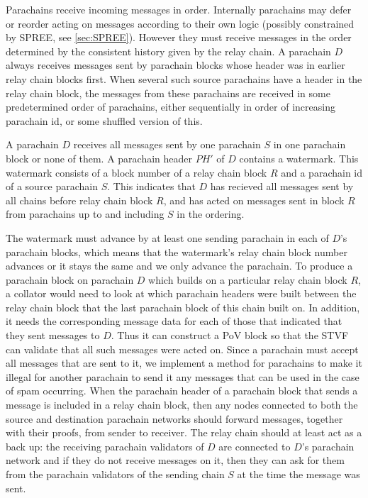 \documentclass{article}
\begin{document}
Parachains receive incoming messages in  order. Internally parachains may defer or reorder acting on messages according to their own logic (possibly constrained by SPREE, see \ref{sec:SPREE}). However they must receive messages in the order determined by the consistent history given by the relay chain.
A parachain $D$ always receives messages sent by parachain blocks whose header was in earlier relay chain blocks first. When several such source parachains have a header in the relay chain block, the messages from these parachains are received in some predetermined order of parachains, either sequentially in order of increasing parachain id, or some shuffled version of this.

A parachain $ D  $ receives all messages sent by one parachain $ S $ in one parachain block or none of them.
A parachain header $PH'$ of $D$ contains a watermark. This watermark consists of a block number of a relay chain block $R$ and a parachain id of a source parachain $S$. This indicates that $D$ has recieved all messages sent by all chains before relay chain block $R$, and has acted on messages sent in block $R$ from parachains up to and including $S$ in the ordering.



The watermark must advance by at least one sending parachain in each of $ D $’s parachain blocks, which means that the watermark's relay chain block number advances or it stays the same and we only advance the parachain. To produce a parachain block on parachain $D$ which builds on a particular relay chain block $R$, a collator would need to look at which parachain headers were built between the relay chain block that the last parachain block of this chain built on. In addition, it needs the corresponding message data for each of those that indicated that they sent messages to $D$.
Thus it can construct a PoV block so that the STVF can validate that all such messages were acted on. Since a parachain must accept all messages that are sent to it,
we implement a method for parachains to make it illegal for another parachain to send it any messages that can be used in the case of spam occurring. When the parachain header of a parachain block that sends a message is included in a relay chain block, then any nodes connected to both the source and destination parachain networks should forward messages, together with their proofs, from sender to receiver.
The relay chain should at least act as a back up: the receiving parachain validators  of $D$ are connected to $D$'s parachain network and if they do not receive messages on it, then they can ask for them from the parachain validators of the sending chain $S$ at the time the message was sent.
\end{document}
